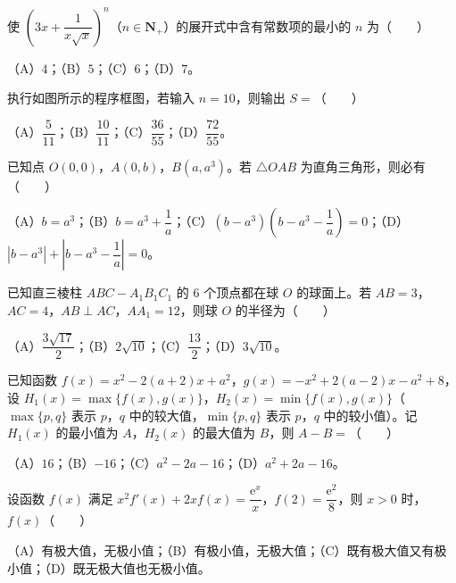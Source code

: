 \begin{question}
使 $\left(3x+\dfrac{1}{x\sqrt{x}}\right)^n$（$n\in\mathbf N_+$）的展开式中含有常数项的最小的 $n$ 为\mbox{（　　）}

（A）$4$；（B）$5$；（C）$6$；（D）$7$。

\Needspace{0.4\textheight}
\end{question}
\begin{question}
执行如图所示的程序框图，若输入 $n=10$，则输出 $S=$\mbox{（　　）}
\nopagebreak[4]
\begin{center}\end{center}
\nopagebreak[4]
（A）$\dfrac5{11}$；（B）$\dfrac{10}{11}$；（C）$\dfrac{36}{55}$；（D）$\dfrac{72}{55}$。

\end{question}
\begin{question}
已知点 $O(0,0)$，$A(0,b)$，$B(a,a^3)$。若 $\triangle OAB$ 为直角三角形，则必有\mbox{（　　）}

（A）$b=a^3$；（B）$b=a^3+\dfrac1a$；（C）$(b-a^3)\left(b-a^3-\dfrac1a\right)=0$；（D）$|b-a^3|+\left|b-a^3-\dfrac1a\right|=0$。

\end{question}
\begin{question}
已知直三棱柱 $ABC-A_1B_1C_1$ 的 $6$ 个顶点都在球 $O$ 的球面上。若 $AB=3$，$AC=4$，$AB\perp AC$，$AA_1=12$，则球 $O$ 的半径为\mbox{（　　）}

（A）$\dfrac{3\sqrt{17}}2$；（B）$2\sqrt{10}$；（C）$\dfrac{13}2$；（D）$3\sqrt{10}$。

\end{question}
\begin{question}
已知函数 $f(x)=x^2-2(a+2)x+a^2$，$g(x)=-x^2+2(a-2)x-a^2+8$，设 $H_1(x)=\max\{f(x),g(x)\}$，$H_2(x)=\min\{f(x),g(x)\}$（$\max\{p,q\}$ 表示 $p$，$q$ 中的较大值，$\min\{p,q\}$ 表示 $p$，$q$ 中的较小值）。记 $H_1(x)$ 的最小值为 $A$，$H_2(x)$ 的最大值为 $B$，则 $A-B=$\mbox{（　　）}

（A）$16$；（B）$-16$；（C）$a^2-2a-16$；（D）$a^2+2a-16$。

\end{question}
\begin{question}
设函数 $f(x)$ 满足 $x^2f'(x)+2xf(x)=\dfrac{\mathrm e^x}{x}$，$f(2)=\dfrac{\mathrm e^2}8$，则 $x>0$ 时，$f(x)$\mbox{（　　）}

（A）有极大值，无极小值；（B）有极小值，无极大值；（C）既有极大值又有极小值；（D）既无极大值也无极小值。

\end{question}


